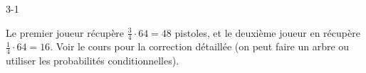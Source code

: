 \begin{corrige}{3-1}

Le premier joueur récupère $\frac34 \cdot 64 = 48$ pistoles, et le deuxième joueur en récupère $\frac14 \cdot 64 = 16$. Voir le cours pour la correction détaillée (on peut faire un arbre ou utiliser les probabilités conditionnelles).

\end{corrige}
